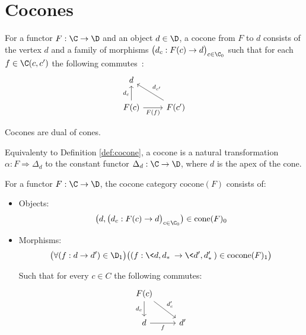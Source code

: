 \section{Cocones}

\begin{definition}
	For a functor $F:\C\to \D$ and an object $d\in \D$, a cocone from $F$ to $d$
	consists of the vertex $d$ and a family of morphisms $\big(d_c: F(c) \to
	d\big)_{c\in \C_0}$ such that for each $f \in \C(c, c')$ the following
	commutes~\parencite[p.~126]{leinster:basic_category_theory}:
	\[\begin{tikzcd}[ampersand replacement=\&]
		d \\
		{F(c)} \& {F(c')}
		\arrow["{d_{c'}}"', from=2-2, to=1-1]
		\arrow["{d_c}", from=2-1, to=1-1]
		\arrow["{F(f)}"', from=2-1, to=2-2]
	\end{tikzcd}\]
\end{definition}

\begin{remark}
	Cocones are dual of cones.
\end{remark}

\begin{definition}
	Equivalenty to Definition \ref{def:cocone}, a cocone is a natural
	transformation $\alpha: F \Rightarrow \Delta_d$ to the constant functor
	$\Delta_d:\C\to \D$, where $d$ is the apex of the cone.
\end{definition}

\begin{definition}
  For a functor $F:\C\to \D$, the cocone category $\mathrm{cocone}(F)$ consists
  of:

  \begin{itemize}
    \item Objects:
      \[\big(d, \big(d_c: F(c) \to d\big)_{c\in \C_0}\big)\in
        \mathrm{cone}(F)_0\]
    \item Morphisms:
      \[\big(\forall (f : d\to d')\in \D_1\big)
        \big((f:\<d, d_*\>\to \<d', d'_*\>)\in \mathrm{cocone}(F)_1\big)\]

      Such that for every $c\in C$ the following commutes:
      \[\begin{tikzcd}[ampersand replacement=\&]
        {F(c)} \\
        d \& {d'}
        \arrow["{d_c}"', from=1-1, to=2-1]
        \arrow["{d'_c}", from=1-1, to=2-2]
        \arrow["f"', from=2-1, to=2-2]
      \end{tikzcd}\]
  \end{itemize}
\end{definition}